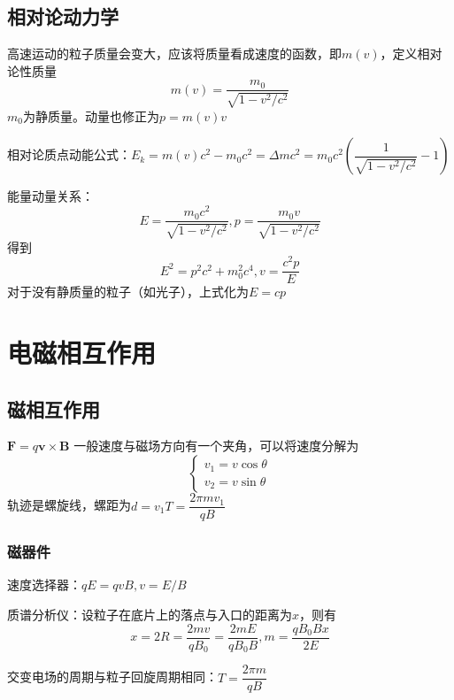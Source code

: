 \subsection{相对论动力学}
高速运动的粒子质量会变大，应该将质量看成速度的函数，即$m(v)$，定义相对论性质量
\begin{equation}
    m(v)=\dfrac{m_0}{\sqrt{1-v^2/c^2}}
\end{equation}
$m_0$为静质量。动量也修正为$p=m(v)v$

相对论质点动能公式：$E_k=m(v)c^2-m_0c^2=\Delta m c^2=m_0c^2(\dfrac{1}{\sqrt{1-v^2/c^2}}-1)$

能量动量关系：
\begin{equation}
    E=\dfrac{m_0c^2}{\sqrt{1-v^2/c^2}},p=\dfrac{m_0v}{\sqrt{1-v^2/c^2}}
\end{equation}
得到
\begin{equation}
    E^2=p^2c^2+m_0^2c^4,v=\dfrac{c^2p}{E}
\end{equation}
对于没有静质量的粒子（如光子），上式化为$E=cp$

\section{电磁相互作用} 
\subsection{磁相互作用}
 $\bm{F}=q\bm{v}\times \bm{B}$
一般速度与磁场方向有一个夹角，可以将速度分解为
\begin{equation}
    \begin{cases}
        v_1=v\cos \theta\\
        v_2=v\sin \theta
    \end{cases}
\end{equation}
轨迹是螺旋线，螺距为$d=v_1T=\dfrac{2\pi m v_1}{qB}$

\subsubsection{磁器件}

速度选择器：$qE=qvB,v=E/B$

质谱分析仪：设粒子在底片上的落点与入口的距离为$x$，则有
\begin{equation}
    x=2R=\dfrac{2mv}{qB_0}=\dfrac{2mE}{qB_0B},m=\dfrac{qB_0Bx}{2E}
\end{equation}

交变电场的周期与粒子回旋周期相同：$T=\dfrac{2\pi m}{qB}$

